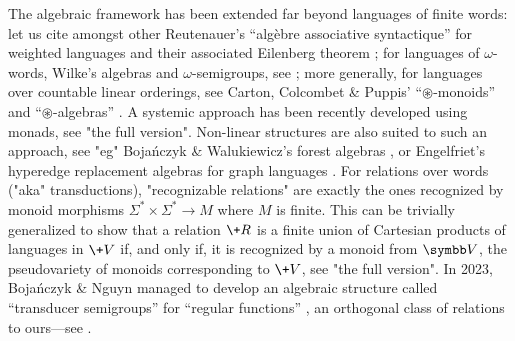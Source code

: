 The algebraic framework has been extended far beyond languages of finite words: let us cite amongst other Reutenauer's ``algèbre associative syntactique'' for weighted languages
	\cite[Théorème I.2.1, p.~451]{reutenauer_series_1980} and their associated Eilenberg theorem \cite[Théorème III.1.1, p.~469]{reutenauer_series_1980};
	for languages of $\omega$-words, Wilke's algebras and $\omega$-semigroups,
	see \cite[\S II, pp.~75--131 \& \S VI, pp.~265--306]{perrin_infinite_2004};
	more generally, for languages over countable linear orderings, see Carton, Colcombet \& Puppis' ``$\circledast$-monoids'' and ``$\circledast$-algebras''
	\cite[\S 3, p.~7]{carton_algebraic_2018}.
A systemic approach has been recently developed using monads, see "the full version".
Non-linear structures are also suited to such an approach, see "eg" Bojańczyk \& Walukiewicz's 
forest algebras \cite[\S 1.3, p.~4]{bojanczyk_forest_2008} \cite[\S 5, p.~159]{bojanczyk_languages_2020}, or Engelfriet's hyperedge replacement algebras for graph languages
\cite[\S 2.3, p.~100]{courcelle_graph_2012} \cite[\S 6.2, p.~194]{bojanczyk_recognisable_2015}.
For relations over words ("aka" transductions), "recognizable 
relations" are exactly the ones recognized by monoid morphisms $\Sigma^* \times \Sigma^* \to M$ 
where $M$ is finite. This can be trivially generalized to show 
that a relation $\+R$ is a finite union of Cartesian products of languages in $\+V$ if, and only 
if, it is recognized by a monoid from $\B{V}$, the pseudovariety of monoids corresponding to
$\+V$, see "the full version".
In 2023, Bojańczyk \& Nguyn 
managed to develop an algebraic structure called ``transducer semigroups'' for ``regular functions'' \cite[Theorem 3.2, p.~6]{bojanczyk_algebraic_2023}, an 
orthogonal class of relations to ours---see .

